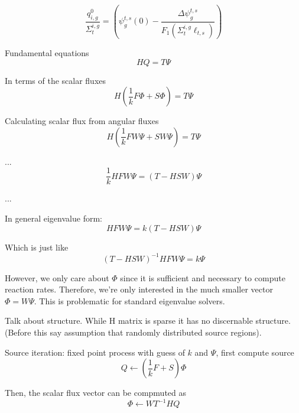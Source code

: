 \begin{dmath}
	\frac{q^0_{i,g}}{\Sigma_{t}^{i,g}} = \left( \psi_g^{t,s}(0) - \frac{\Delta \psi_g^{t,s}}{F_1\left(\Sigma_{t}^{i,g} \ell_{t,s} \right)} \right) 
\end{dmath}

Fundamental equations
\begin{dmath}
	HQ = T \Psi
\end{dmath}

In terms of the scalar fluxes
\begin{dmath}
	H\left(\frac{1}{k} F \Phi + S \Phi\right) = T \Psi
\end{dmath}

Calculating scalar flux from angular fluxes
\begin{dmath}
	H\left(\frac{1}{k} F W\Psi + S W \Psi\right) = T \Psi
\end{dmath}

...
\begin{dmath}
	\frac{1}{k} H F W\Psi = \left(T - H S W \right)\Psi
\end{dmath}

...


In general eigenvalue form:
\begin{dmath}
	H F W\Psi =  k \left(T - H S W \right) \Psi
\end{dmath}

Which is just like
\begin{dmath}
	\left(T - H S W \right)^{-1} H F W\Psi =  k\Psi
\end{dmath}


However, we only care about $\Phi$ since it is sufficient and necessary to compute reaction rates. Therefore, we're only interested in the much smaller vector $\Phi = W \Psi$. This is problematic for standard eigenvalue solvers.

Talk about structure. While H matrix is sparse it has no discernable structure. (Before this say assumption that randomly distributed source regions).

Source iteration: fixed point process with guess of $k$ and $\Psi$, first compute source
\begin{dmath}
	Q \leftarrow \left(\frac{1}{k} F + S \right) \Phi
\end{dmath}

Then, the scalar flux vector can be compmuted as
\begin{dmath}
	\Phi \leftarrow W T^{-1} H Q
\end{dmath}

